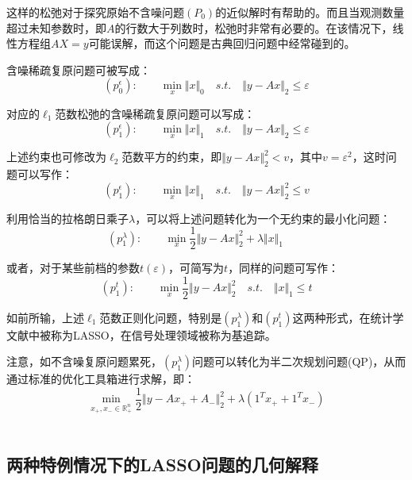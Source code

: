 这样的松弛对于探究原始不含噪问题$ (P_0) $的近似解时有帮助的。而且当观测数量超过未知参数时，即$ A $的行数大于列数时，松弛时非常有必要的。在该情况下，线性方程组$ AX=y $可能误解，而这个问题是古典回归问题中经常碰到的。

含噪稀疏复原问题可被写成：
\begin{equation}\label{key}
(p_{0}^{\epsilon}):\qquad \min_{x}\Vert x\Vert_0\quad s.t.\quad\Vert y-Ax\Vert_2\leq \varepsilon
\end{equation}

对应的$ \ell_1 $范数松弛的含噪稀疏复原问题可以写成：
\begin{equation}\label{key}
(p_{1}^{\epsilon}):\qquad \min_{x}\Vert x\Vert_1\quad s.t.\quad\Vert y-Ax\Vert_2\leq \varepsilon
\end{equation}

上述约束也可修改为$ \ell_2 $范数平方的约束，即$ \Vert y-Ax\Vert_2^2<v $，其中$ v=\varepsilon^2 $，这时问题可以写作：
\begin{equation*}\label{key}
(p_{1}^{\epsilon}):\qquad \min_{x}\Vert x\Vert_1\quad s.t.\quad\Vert y-Ax\Vert_2^2\leq v
\end{equation*}

利用恰当的拉格朗日乘子$ \lambda $，可以将上述问题转化为一个无约束的最小化问题：
\begin{equation}\label{key}
(p_{1}^{\lambda}):\qquad \min_{x} \dfrac{1}{2}\Vert y-Ax\Vert_2^2 + \lambda \Vert x\Vert_1 \qquad
\end{equation}

或者，对于某些前档的参数$ t(\varepsilon) $，可简写为$ t $，同样的问题可写作：
\begin{equation}\label{formula:chapsrt01:p1t}
(p_{1}^{t}):\qquad \min_{x} \dfrac{1}{2}\Vert y-Ax\Vert_2^2 \quad s.t.\quad \Vert x\Vert_1 \leq t
\end{equation}

如前所输，{\heiti 上述$ \ell_1 $范数正则化问题，特别是$(p_{1}^{\lambda})$和$(p_{1}^{t})$这两种形式，在统计学文献中被称为LASSO，在信号处理领域被称为基追踪。}

注意，如不含噪复原问题累死，$ (p_{1}^{\lambda}) $问题可以转化为半二次规划问题(QP)，从而通过标准的优化工具箱进行求解，即：
\begin{equation}\label{key}
\min_{x_{+},x_{-}\in \mathbb{R}^{n}_{+}} \dfrac{1}{2}\Vert y-Ax_{+}+A_{-}\Vert_2^2 + \lambda (1^{T}x_{+}+1^{T}x_{-})
\end{equation}
　

\subsection{两种特例情况下的LASSO问题的几何解释}

